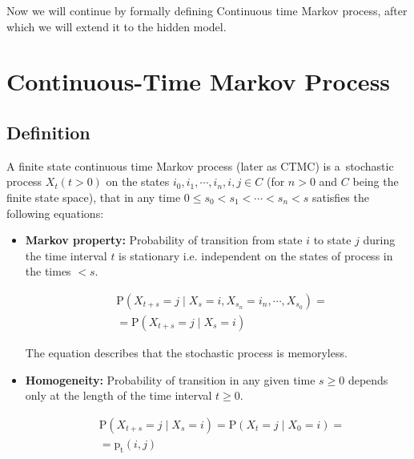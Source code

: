 \documentclass[thesis=M,english]{FITthesis}[2012/10/20]
\begin{document}
Now we will continue by formally defining Continuous time Markov process, after which we will extend it to the hidden model.

\section{Continuous-Time Markov Process} 

\subsection{Definition}
A finite state continuous time Markov process (later as CTMC) is a~stochastic process $X_t (t > 0)$ on the states $i_0, i_1, \cdots, i_n, i, j \in C$ (for $n>0$ and $C$ being the finite state space), that in any time $0 \leq s_0 < s_1 < \cdots < s_n < s$ satisfies the following equations: 
\begin{itemize}
\item \textbf{Markov property:} Probability of transition from state $i$ to state $j$ during the time interval $t$ is stationary i.e. independent on the states of process in the times $< s$.  
    
\begin{equation}
\begin{aligned}
& \mathrm{P}( X_{t+s} = j \mid X_s = i, X_{s_n} = i_n, \cdots , X_{s_0} ) = \\ 
& = \mathrm{P}( X_{t+s} = j \mid X_s = i )
\end{aligned}
\end{equation}

The equation describes that the stochastic process is memoryless.

\item \textbf{Homogeneity:} Probability of transition in any given time $s \geq 0$ depends only at the length of the time interval $t \geq 0$. 

\begin{equation}
\begin{aligned}
& \mathrm{P}( X_{t+s} = j \mid X_s = i ) = \mathrm{P}( X_t = j \mid X_0 = i ) = \\
& = \mathrm{p_t}(i,j)
\end{aligned}
\end{equation}

\end{itemize}
\end{document}
